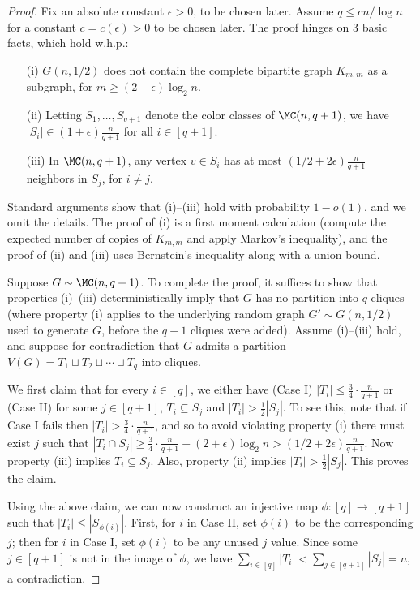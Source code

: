 \documentclass{article}
\begin{document}
\begin{proof}
Fix an absolute constant $\epsilon > 0$, to be chosen later. Assume $q \le c n /\log n$ for a constant $c = c(\epsilon) > 0$ to be chosen later. The proof hinges on 3 basic facts, which hold w.h.p.:
\begin{itemize}
    \item[(i)] $G(n,1/2)$ does not contain the complete bipartite graph $K_{m,m}$ as a subgraph, for $m \ge (2+\epsilon) \log_2 n$.
    \item[(ii)] Letting $S_1,\ldots,S_{q+1}$ denote the color classes of $\MC(n,q+1)$, we have $|S_i| \in (1 \pm \epsilon) \frac{n}{q+1}$ for all $i \in [q+1]$.
    \item[(iii)] In $\MC(n,q+1)$, any vertex $v \in S_i$ has at most $(1/2 + 2\epsilon)\frac{n}{q+1}$ neighbors in $S_j$, for $i \ne j$.
\end{itemize}
Standard arguments show that (i)--(iii) hold with probability $1-o(1)$, and we omit the details. The proof of (i) is a first moment calculation (compute the expected number of copies of $K_{m,m}$ and apply Markov's inequality), and the proof of (ii) and (iii) uses Bernstein's inequality along with a union bound.

Suppose $G \sim \MC(n,q+1)$. To complete the proof, it suffices to show that properties (i)--(iii) deterministically imply that $G$ has no partition into $q$ cliques (where property (i) applies to the underlying random graph $G' \sim G(n,1/2)$ used to generate $G$, before the $q+1$ cliques were added). Assume (i)--(iii) hold, and suppose for contradiction that $G$ admits a partition $V(G) = T_1 \sqcup T_2 \sqcup \cdots \sqcup T_q$ into cliques.

We first claim that for every $i \in [q]$, we either have (Case I) $|T_i| \le \frac{3}{4} \cdot \frac{n}{q+1}$ or (Case II) for some $j \in [q+1]$, $T_i \subseteq S_j$ and $|T_i| > \frac{1}{2}|S_j|$. To see this, note that if Case I fails then $|T_i| > \frac{3}{4} \cdot \frac{n}{q+1}$, and so to avoid violating property (i) there must exist $j$ such that $|T_i \cap S_j| \ge \frac{3}{4} \cdot \frac{n}{q+1} - (2+\epsilon) \log_2 n > (1/2 + 2\epsilon) \frac{n}{q+1}$. Now property (iii) implies $T_i \subseteq S_j$. Also, property (ii) implies $|T_i| > \frac{1}{2}|S_j|$. This proves the claim.

Using the above claim, we can now construct an injective map $\phi: [q] \to [q+1]$ such that $|T_i| \le |S_{\phi(i)}|$. First, for $i$ in Case II, set $\phi(i)$ to be the corresponding $j$; then for $i$ in Case I, set $\phi(i)$ to be any unused $j$ value. Since some $j \in [q+1]$ is not in the image of $\phi$, we have $\sum_{i \in [q]} |T_i| < \sum_{j \in [q+1]} |S_j| = n$, a contradiction.
\end{proof}






\end{document}
